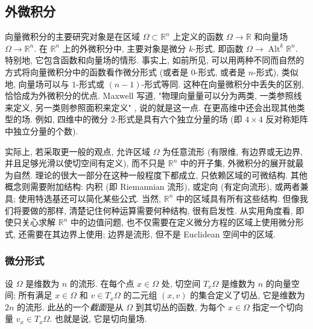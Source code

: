 \subsection{{外微积分}}\label{sec:exterior-calculus}

{向量微积分的主要研究对象是在区域 $\Omega\subset\mathbb R^n$ 上定义的函数 $\Omega\to\mathbb R$ 和向量场 $\Omega\to\mathbb R^n$. 在 $\mathbb R^n$ 上的外微积分中, 主要对象是微分 $k$-形式, 即函数 $\Omega\to\operatorname{Alt}^k\mathbb R^n$. 特别地, 它包含函数和向量场的情形. 事实上, 如前所见, 可以用两种不同而自然的方式将向量微积分中的函数看作微分形式 (或者是 $0$-形式, 或者是 $n$-形式), 类似地, 向量场可以与 $1$-形式或 $(n-1)$-形式等同. 这种在向量微积分中丢失的区别, 恰恰成为外微积分的优点. Maxwell 写道, "物理向量量可以分为两类, 一类参照线来定义, 另一类则参照面积来定义" , 说的就是这一点. 在更高维中还会出现其他类型的场. 例如, 四维中的微分 $2$-形式是具有六个独立分量的场 (即 $4\times4$ 反对称矩阵中独立分量的个数).}

{实际上, 若采取更一般的观点, 允许区域 $\Omega$ 为任意流形 (有限维, 有边界或无边界, 并且足够光滑以使切空间有定义), 而不只是 $\mathbb R^n$ 中的开子集, 外微积分的展开就最为自然. 理论的很大一部分在这种一般程度下都成立, 只依赖区域的可微结构. 其他概念则需要附加结构: 内积 (即 Riemannian 流形), 或定向 (有定向流形), 或两者兼具; 使用特选基还可以简化某些公式. 当然, $\mathbb R^n$ 中的区域具有所有这些结构. 但像我们将要做的那样, 清楚记住何种运算需要何种结构, 很有启发性. 从实用角度看, 即使只关心求解 $\mathbb R^n$ 中的边值问题, 也不仅需要在定义微分方程的区域上使用微分形式, 还需要在其边界上使用; 边界是流形, 但不是 Euclidean 空间中的区域.}

\subsubsection{{微分形式}}\label{subsec:differential-forms}

{设 $\Omega$ 是维数为 $n$ 的流形. 在每个点 $x\in\Omega$ 处, 切空间 $T_x\Omega$ 是维数为 $n$ 的向量空间; 所有满足 $x\in\Omega$ 和 $v\in T_x\Omega$ 的二元组 $(x,v)$ 的集合定义了切丛, 它是维数为 $2n$ 的流形. 此丛的一个\emph{截面}是从 $\Omega$ 到其切丛的函数, 为每个 $x\in\Omega$ 指定一个切向量 $v_x\in T_x\Omega$. 也就是说, 它是切向量场.}

